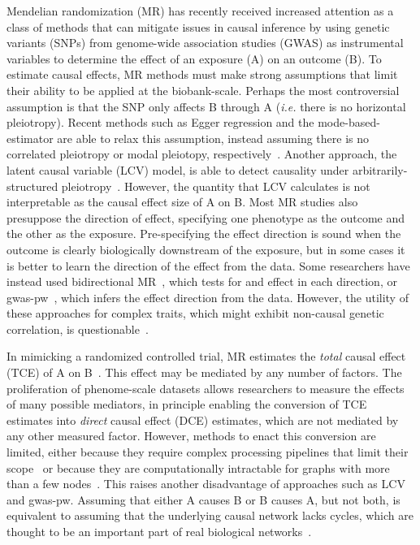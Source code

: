 \documentclass{article}
\begin{document}
Mendelian randomization (MR) has recently received increased attention as a class of methods
that can mitigate issues in causal inference
 by using genetic variants (SNPs) from genome-wide
association studies (GWAS) as instrumental variables to determine the effect
of an exposure (A) on an outcome (B). To estimate causal effects,
MR methods must make strong assumptions that limit their
ability to be applied at the biobank-scale. Perhaps the most
controversial assumption is that the SNP only affects B through A
(\textit{i.e.} there is no horizontal pleiotropy). Recent methods such as Egger
regression and the mode-based-estimator are able to relax this assumption, instead
assuming there is no correlated pleiotropy or modal pleiotopy, respectively~\cite{Bowden2015,Hartwig2017}.
Another approach, the latent causal variable (LCV) model, is able to detect causality
under arbitrarily-structured pleiotropy~\cite{OConnor2018}. However, the quantity that LCV
calculates is not interpretable as the causal effect size of A on B. Most MR studies
also presuppose the direction of effect, specifying one phenotype as the outcome and
the other as the exposure. Pre-specifying the effect direction is sound when the outcome
is clearly biologically downstream of the exposure, but in some cases it is better
to learn the direction of the effect from the data.
Some researchers have instead used bidirectional MR~\cite{Timpson2011, Richmond2014}, which tests for
and effect in each direction, or gwas-pw~\cite{Pickrell2016}, which infers the effect
direction from the data.
However, the utility of these approaches for complex traits,
which might exhibit non-causal genetic correlation,
is questionable~\cite{OConnor2018}.

In mimicking a randomized controlled trial, MR estimates the
\emph{total} causal effect (TCE) of A on B~\cite{Burgess2015}. This effect may be mediated by
any number of factors. The proliferation of phenome-scale datasets
allows researchers to measure the effects of many possible mediators,
in principle enabling the conversion of TCE estimates into \emph{direct} causal effect (DCE)
estimates, which are not mediated by any other measured factor.
However, methods to enact this conversion are limited, either because they require complex
processing pipelines that limit their scope~\cite{Amar2019} or because they are
computationally intractable for graphs with more than a few nodes~\cite{Badsha2019}.
This raises another disadvantage of approaches such as LCV and gwas-pw. Assuming that either
A causes B or B causes A, but not both, is equivalent to assuming
that the underlying causal network
lacks cycles, which are thought to be an important part of real biological networks~\cite{Zhu2007}.
\end{document}
